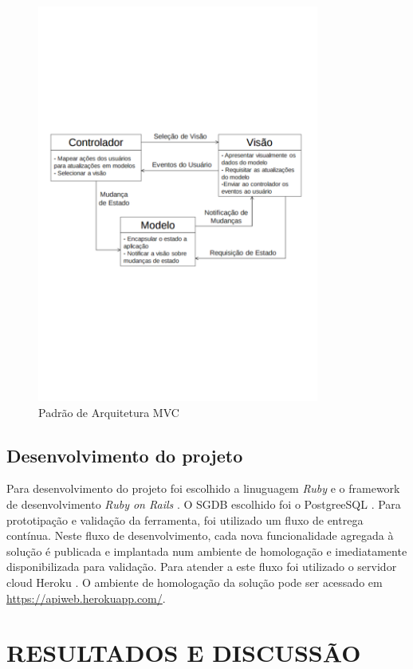 \documentclass{abnt}
\begin{document}
\begin{figure}[!htb]
	\centering
	\includegraphics[width=350px]{mvc.pdf}
	\caption{Padrão de Arquitetura MVC}
	\label{MVCC}
\end{figure}

\section{Desenvolvimento do projeto}

Para desenvolvimento do projeto foi escolhido a linuguagem \textit{Ruby} 
\cite{Ruby} e o framework de desenvolvimento \textit{Ruby on Rails} \cite{Rails}.
O SGDB \cite{SGDB} escolhido foi o PostgreeSQL \cite{Postgree}. Para
prototipação e validação da ferramenta, foi utilizado um fluxo de entrega
contínua. Neste fluxo de desenvolvimento, cada nova funcionalidade agregada à
solução é publicada e implantada num ambiente de homologação e imediatamente
disponibilizada para validação. Para atender a este fluxo foi utilizado o
servidor cloud Heroku \cite{Heroku}. O ambiente de homologação da solução pode
ser acessado em \url{https://apiweb.herokuapp.com/}.

\chapter{RESULTADOS E DISCUSSÃO}
\end{document}
